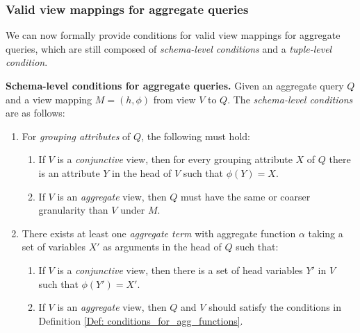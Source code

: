 \subsubsection{Valid view mappings for aggregate queries}\label{Sec: validity conditions for aggregate queries}
We can now formally provide conditions for valid view mappings for aggregate queries, which are still composed of {\em schema-level conditions} and a {\em tuple-level condition}.


\begin{definition}
{\bf Schema-level conditions for aggregate queries.}
Given an aggregate query $Q$ and %
 a view mapping $M = (h, \phi)$ from view $V$ to $Q$. The {\em schema-level conditions} are as follows:
\begin{enumerate}
\item For \textit{grouping attributes} of $Q$, the following must hold:
\begin{enumerate}
\item If $V$ is a \textit{conjunctive} view, then for every grouping attribute $X$ of $Q$ there is an attribute $Y$ in the head of $V$ such that $\phi(Y) = X$.
\item If $V$ is an \textit{aggregate} view, then $Q$ must have the same or coarser granularity than $V$ under $M$.
\end{enumerate}
\item There exists at least one \textit{aggregate term }with aggregate function $\alpha$ taking a set of variables $X'$ as arguments in the head of $Q$ such that:
\begin{enumerate}
\item If $V$ is a \textit{conjunctive} view, then there is a set of head variables $Y'$ in $V$ such that $\phi(Y') = X'$.
\item If $V$ is an \textit{aggregate} view, then $Q$ and $V$ should satisfy the conditions in Definition \ref{Def: conditions_for_agg_functions}.




\end{enumerate}
\end{enumerate}
\end{definition}

